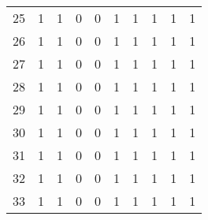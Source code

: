 \begin{longtable}{cp{1.5cm}p{1.5cm}p{1.5cm}p{1.5cm}p{1.5cm}p{1.5cm}p{1.5cm}p{1.5cm}p{1.5cm}}
25 &                          1 &                             1 &                          0 &                        0 &                           1 &                        1 &                         1 &                            1 &                         1 \\
26 &                          1 &                             1 &                          0 &                        0 &                           1 &                        1 &                         1 &                            1 &                         1 \\
27 &                          1 &                             1 &                          0 &                        0 &                           1 &                        1 &                         1 &                            1 &                         1 \\
28 &                          1 &                             1 &                          0 &                        0 &                           1 &                        1 &                         1 &                            1 &                         1 \\
29 &                          1 &                             1 &                          0 &                        0 &                           1 &                        1 &                         1 &                            1 &                         1 \\
30 &                          1 &                             1 &                          0 &                        0 &                           1 &                        1 &                         1 &                            1 &                         1 \\
31 &                          1 &                             1 &                          0 &                        0 &                           1 &                        1 &                         1 &                            1 &                         1 \\
32 &                          1 &                             1 &                          0 &                        0 &                           1 &                        1 &                         1 &                            1 &                         1 \\
33 &                          1 &                             1 &                          0 &                        0 &                           1 &                        1 &                         1 &                            1 &                         1 \\

\end{longtable}

